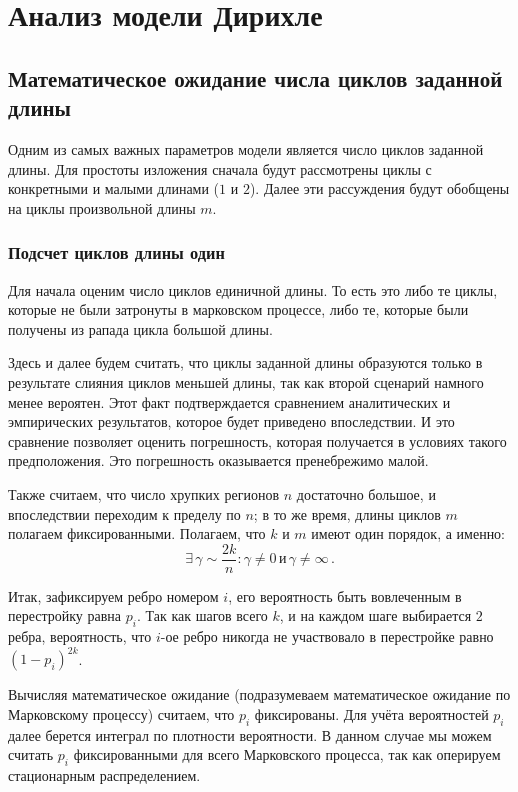 \chapter{Анализ модели Дирихле}

\section{Математическое ожидание числа циклов заданной длины}
Одним из самых важных параметров модели является число циклов заданной длины.
Для простоты изложения сначала будут рассмотрены циклы с конкретными и малыми длинами ($1$ и $2$).
Далее эти рассуждения будут обобщены на циклы произвольной длины $m$.

\subsection{Подсчет циклов длины один}
Для начала оценим число циклов единичной длины.
То есть это либо те циклы, которые не были затронуты в марковском процессе, либо те, которые были получены из рапада цикла большой длины.

Здесь и далее будем считать, что циклы заданной длины образуются только в результате слияния циклов меньшей длины, так как второй сценарий намного менее вероятен.
Этот факт подтверждается сравнением аналитических и эмпирических результатов, которое будет приведено впоследствии.
И это сравнение позволяет оценить погрешность, которая получается в условиях такого предположения.
Это погрешность оказывается пренебрежимо малой.

Также считаем, что число хрупких регионов $n$ достаточно большое, и впоследствии переходим к пределу по $n$; в то же время, длины циклов $m$ полагаем фиксированными. Полагаем, что $k$ и $m$ имеют один порядок, а именно: $$\exists \, \gamma \sim \frac {2k} n : \gamma \neq 0 \, \textrm{и} \, \gamma \neq \infty \, .$$

Итак, зафиксируем ребро номером $i$, его вероятность быть вовлеченным в перестройку равна $p_i$.
Так как шагов всего $k$, и на каждом шаге выбирается $2$ ребра, вероятность, что $i$-ое ребро никогда не участвовало в перестройке равно $(1 - p_i) ^ {2k}$.

Вычисляя математическое ожидание (подразумеваем математическое ожидание по Марковскому процессу) считаем, что $p_i$ фиксированы. Для учёта вероятностей $p_i$ далее берется интеграл по плотности вероятности. В данном случае мы можем считать $p_i$ фиксированными для всего Марковского процесса, так как оперируем стационарным распределением.


